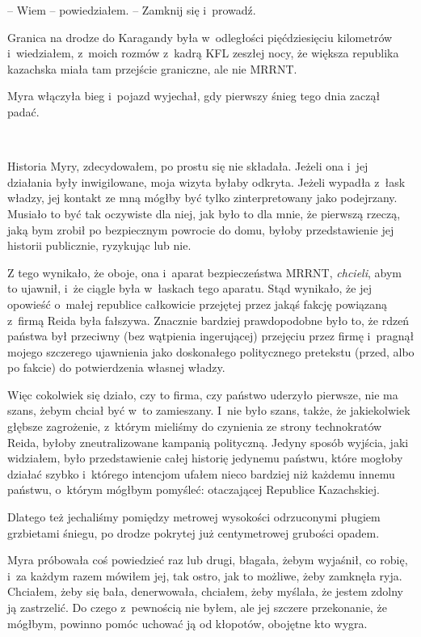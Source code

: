 \documentclass[oneside,polish,11pt,sfheadings]{mwbk}
\begin{document}
-- Wiem -- powiedziałem. -- Zamknij się i~prowadź.

Granica na drodze do Karagandy była w~odległości pięćdziesięciu
kilometrów i~wiedziałem, z~moich rozmów z~kadrą KFL zeszłej nocy, że
większa republika kazachska miała tam przejście graniczne, ale nie
MRRNT.

Myra włączyła bieg i~pojazd wyjechał, gdy pierwszy śnieg tego dnia
zaczął padać.

~

Historia Myry, zdecydowałem, po prostu się nie składała. Jeżeli ona i~jej działania były inwigilowane, moja wizyta byłaby odkryta. Jeżeli
wypadła z~łask władzy, jej kontakt ze mną mógłby być tylko
zinterpretowany jako podejrzany. Musiało to być tak oczywiste dla niej,
jak było to dla mnie, że pierwszą rzeczą, jaką bym zrobił po bezpiecznym
powrocie do domu, byłoby przedstawienie jej historii publicznie,
ryzykując lub nie.

Z tego wynikało, że oboje, ona i~aparat bezpieczeństwa MRRNT,
\emph{chcieli}, abym to ujawnił, i~że ciągle była w~łaskach tego
aparatu. Stąd wynikało, że jej opowieść o~małej republice całkowicie
przejętej przez jakąś fakcję powiązaną z~firmą Reida była fałszywa.
Znacznie bardziej prawdopodobne było to, że rdzeń państwa był przeciwny
(bez wątpienia ingerującej) przejęciu przez firmę i~pragnął mojego
szczerego ujawnienia jako doskonałego politycznego pretekstu (przed,
albo po fakcie) do potwierdzenia własnej władzy.

Więc cokolwiek się działo, czy to firma, czy państwo uderzyło pierwsze,
nie ma szans, żebym chciał być w~to zamieszany. I~nie było szans, także,
że jakiekolwiek głębsze zagrożenie, z~którym mieliśmy do czynienia ze
strony technokratów Reida, byłoby zneutralizowane kampanią polityczną.
Jedyny sposób wyjścia, jaki widziałem, było przedstawienie całej
historię jedynemu państwu, które mogłoby działać szybko i~którego
intencjom ufałem nieco bardziej niż każdemu innemu państwu, o~którym
mógłbym pomyśleć: otaczającej Republice Kazachskiej.

Dlatego też jechaliśmy pomiędzy metrowej wysokości odrzuconymi pługiem
grzbietami śniegu, po drodze pokrytej już centymetrowej grubości opadem.

Myra próbowała coś powiedzieć raz lub drugi, błagała, żebym wyjaśnił, co
robię, i~za każdym razem mówiłem jej, tak ostro, jak to możliwe, żeby
zamknęła ryja. Chciałem, żeby się bała, denerwowała, chciałem, żeby
myślała, że jestem zdolny ją zastrzelić. Do czego z~pewnością nie byłem,
ale jej szczere przekonanie, że mógłbym, powinno pomóc uchować ją od
kłopotów, obojętne kto wygra.
\end{document}
